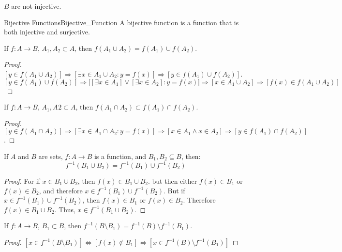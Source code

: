     $B$ are not injective.
    \begin{fdefinition}{Bijective Functions}{Bijective_Function}
        A \gls{bijective function} is a function
        that is both injective and surjective.
    \end{fdefinition}
    \begin{theorem}
    If $f:A\rightarrow B$, $A_1,A_2\subset A$, then $f(A_1 \cup A_2) = f(A_1)\cup f(A_2)$.
    \end{theorem}
    \begin{proof}
    $[y\in f(A_1\cup A_2)]\Rightarrow [\exists x\in A_1 \cup A_2:y=f(x)]\Rightarrow [y \in f(A_1)\cup f(A_2)]$. $[y\in f(A_1)\cup f(A_2)]\Rightarrow \big[[\exists x\in A_1] \lor[\exists x\in A_2]: y=f(x)\big]\Rightarrow [x\in A_1\cup A_2]\Rightarrow [f(x)\in f(A_1\cup A_2)]$
    \end{proof}
    \begin{theorem}
        If $f:A\rightarrow B$, $A_{1},A_{}2\subset A$, then
        $f(A_{1}\cap{A}_{2})\subset{f}(A_{1})\cap{f}(A_{2})$.
    \end{theorem}
    \begin{proof}
        $[y\in f(A_1 \cap A_2)]\Rightarrow [\exists x\in A_1 \cap A_2:y=f(x)]\Rightarrow [x\in A_1 \land x \in A_2] \Rightarrow[y \in f(A_1)\cap f(A_2)]$.
    \end{proof}
    \begin{theorem}
        If $A$ and $B$ are sets, $f:A\rightarrow{B}$ is a function,
        and $B_{1},B_{2}\subseteq{B}$, then:
        \begin{equation}
            f^{-1}(B_{1}\cup{B}_{2})=f^{-1}(B_{1})\cup{f}^{-1}(B_{2})
        \end{equation}
    \end{theorem}
    \begin{proof}
        For if $x\in{B}_{1}\cup{B}_{2}$, then
        $f(x)\in{B}_{1}\cup{B}_{2}$. but then either
        $f(x)\in{B}_{1}$ or $f(x)\in{B}_{2}$, and therefore
        $x\in{f}^{\minus{1}}(B_1)\cup{f}^{\minus{1}}(B_2)$. But if
        $x\in{f}^{\minus{1}}(B_{1})\cup{f}^{\minus{1}}(B_2)$, then
        $f(x)\in{B}_{1}$ or $f(x)\in{B}_{2}$. Therefore
        $f(x)\in{B}_{1}\cup{B}_{2}$. Thus, $x\in{f}^{-1}(B_1\cup{B}_2)$.
    \end{proof}
    \begin{theorem}
    If $f:A\rightarrow B$, $B_1 \subset B$, then $f^{-1}(B\setminus B_1) = f^{-1}(B)\setminus f^{-1}(B_1)$.
    \end{theorem}
    \begin{proof}
    $[x\in f^{-1}(B\setminus B_1)]\Leftrightarrow [f(x)\notin B_1]\Leftrightarrow [x\in f^{-1}(B)\setminus f^{-1}(B_1)]$
    \end{proof}
